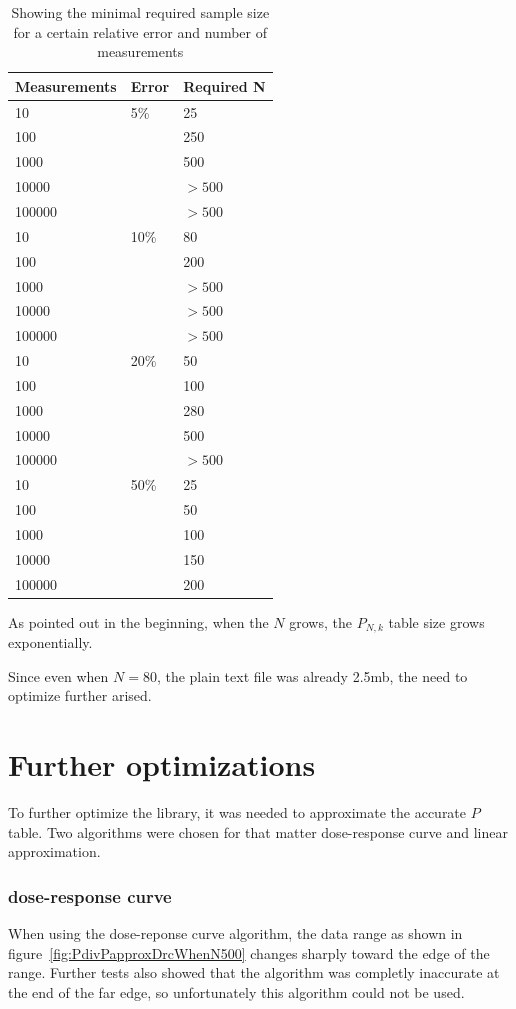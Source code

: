 \documentclass[12pt]{article}
\begin{document}
\begin{table}[!ht]
	\begin{center}
		\caption{Showing the minimal required sample size for a certain relative error and number of measurements}
	    \begin{tabular}{| l | l | l |}
	    \hline
		Measurements & Error & Required N \\
		\hline
		10 & 5\% & 25 \\
		100 & & 250 \\
		1000 & & 500 \\
		10000 & & $>500$ \\
		100000 & & $> 500$ \\
		\hline
		10  & 10\% & 80 \\
		100 & & 200 \\
		1000 & & $>500$ \\
		10000 & & $>500$ \\
		100000  & & $>500$ \\
		\hline
		10  & 20\% & 50 \\
		100 & & 100 \\
		1000  & & 280 \\
		10000  & & 500 \\
		100000  & & $>500$ \\
		\hline
		10  & 50\% &  25 \\
		100 & & 50 \\
		1000 & & 100 \\
		10000 & & 150 \\
		100000 & & 200 \\
		\hline
		\end{tabular}
		\label{table:requiredN}
	\end{center}
\end{table}

As pointed out in the beginning, when the $N$ grows, the $P_{N, k}$ table size grows exponentially.

Since even when $N = 80$, the plain text file was already 2.5mb, the need to optimize further arised.

\section{Further optimizations}

To further optimize the library, it was needed to approximate the accurate $P$ table. Two algorithms were chosen for that matter dose-response curve and linear approximation.

\subsubsection{dose-response curve}
When using the dose-reponse curve algorithm, the data range as shown in figure~\ref{fig:PdivPapproxDrcWhenN500} changes sharply toward the edge of the range. Further tests also showed that the algorithm was completly inaccurate at the end of the far edge, so unfortunately this algorithm could not be used.
\end{document}
